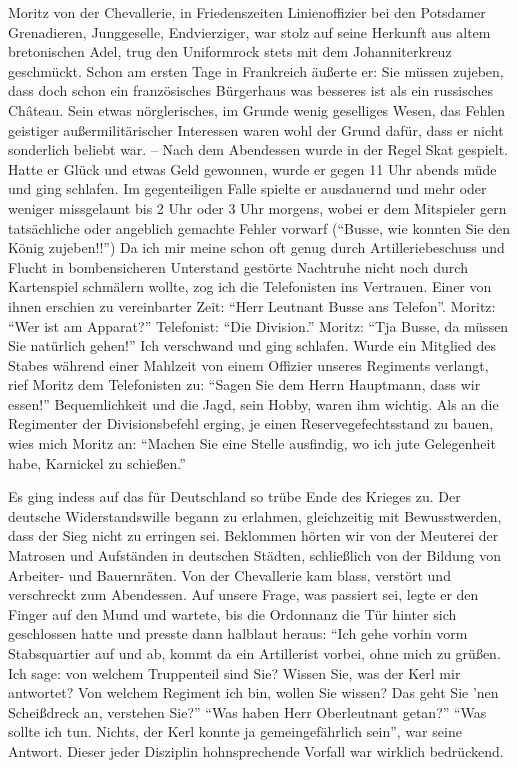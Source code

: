 Moritz von der Chevallerie, in Friedenszeiten Linienoffizier bei den Potsdamer Grenadieren, Junggeselle, Endvierziger, war stolz auf seine Herkunft aus altem bretonischen Adel, trug den Uniformrock stets mit dem Johanniterkreuz geschmückt. Schon am ersten Tage in Frankreich äußerte er: Sie müssen zujeben, dass doch schon ein französisches Bürgerhaus was besseres ist als ein russisches Château. Sein etwas nörglerisches, im Grunde wenig geselliges Wesen, das Fehlen geistiger außermilitärischer Interessen waren wohl der Grund dafür, dass er nicht sonderlich beliebt war. -- Nach dem Abendessen wurde in der Regel Skat gespielt. Hatte er Glück und etwas Geld gewonnen, wurde er gegen 11 Uhr abends müde und ging schlafen. Im gegenteiligen Falle spielte er ausdauernd und mehr oder weniger missgelaunt bis 2 Uhr oder 3 Uhr morgens, wobei er dem Mitspieler gern tatsächliche oder angeblich gemachte Fehler vorwarf (\enquote{Busse, wie konnten Sie den König zujeben!!}) Da ich mir meine schon oft genug durch Artilleriebeschuss und Flucht in bombensicheren Unterstand gestörte Nachtruhe nicht noch durch Kartenspiel schmälern wollte, zog ich die Telefonisten ins Vertrauen. Einer von ihnen erschien zu vereinbarter Zeit: \enquote{Herr Leutnant Busse ans Telefon}. Moritz: \enquote{Wer ist am Apparat?} Telefonist: \enquote{Die Division.} Moritz: \enquote{Tja Busse, da müssen Sie natürlich gehen!} Ich verschwand und ging schlafen. Wurde ein Mitglied des Stabes während einer Mahlzeit von einem Offizier unseres Regiments verlangt, rief Moritz dem Telefonisten zu: \enquote{Sagen Sie dem Herrn Hauptmann, dass wir essen!} Bequemlichkeit und die Jagd, sein Hobby, waren ihm wichtig. Als an die Regimenter der Divisionsbefehl erging, je einen Reservegefechtsstand zu bauen, wies mich Moritz an: \enquote{Machen Sie eine Stelle ausfindig, wo ich jute Gelegenheit habe, Karnickel zu schießen.}

Es ging indess auf das für Deutschland so trübe Ende des Krieges zu. Der deutsche Widerstandswille begann zu erlahmen, gleichzeitig mit Bewusstwerden, dass der Sieg nicht zu erringen sei. Beklommen hörten wir von der Meuterei der Matrosen und Aufständen in deutschen Städten, schließlich von der Bildung von Arbeiter- und Bauernräten. Von der Chevallerie kam blass, verstört und verschreckt zum Abendessen. Auf unsere Frage, was passiert sei, legte er den Finger auf den Mund und wartete, bis die Ordonnanz die Tür hinter sich geschlossen hatte und presste dann halblaut heraus: \enquote{Ich gehe vorhin vorm Stabsquartier auf und ab, kommt da ein Artillerist vorbei, ohne mich zu grüßen. Ich sage: von welchem Truppenteil sind Sie? Wissen Sie, was der Kerl mir antwortet? Von welchem Regiment ich bin, wollen Sie wissen? Das geht Sie 'nen Scheißdreck an, verstehen Sie?} \enquote{Was haben Herr Oberleutnant getan?} \enquote{Was sollte ich tun. Nichts, der Kerl konnte ja gemeingefährlich sein}, war seine Antwort. Dieser jeder Disziplin hohnsprechende Vorfall war wirklich bedrückend.

